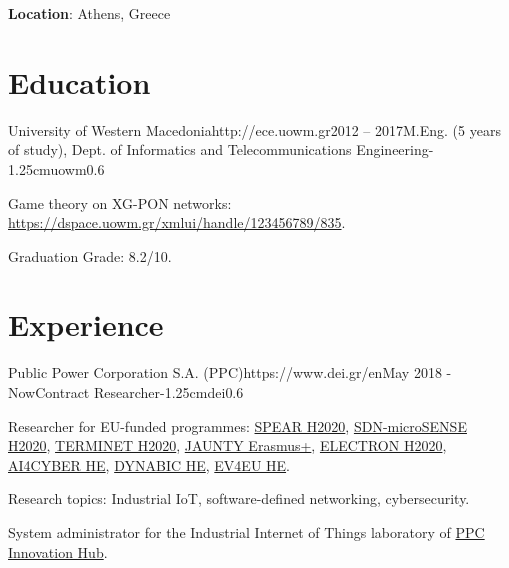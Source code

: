 \documentclass{mycv}
\begin{document}
	\thispagestyle{plain}

	\textbf{Location}: Athens, Greece

	\section{Education}
	
	\begin{EntryDatedLogo}{University of Western Macedonia}{http://ece.uowm.gr}{2012 -- 2017}{M.Eng. (5 years of study), Dept. of Informatics and Telecommunications Engineering}{-1.25cm}{uowm}{0.6}
		\begin{Itemize}
			\item Game theory on XG-PON networks: \url{https://dspace.uowm.gr/xmlui/handle/123456789/835}.
			\item Graduation Grade: 8.2/10.
		\end{Itemize}
	\end{EntryDatedLogo}
	
	\section{Experience}
		\begin{EntryDatedLogo}{Public Power Corporation S.A. (PPC)}{https://www.dei.gr/en}{May 2018 - Now}{Contract Researcher}{-1.25cm}{dei}{0.6}
		\begin{Itemize}
			\item Researcher for EU-funded programmes: \href{https://cordis.europa.eu/project/id/787011}{SPEAR H2020}, \href{https://cordis.europa.eu/project/id/833955}{SDN-microSENSE H2020}, \href{https://cordis.europa.eu/project/id/957406}{TERMINET H2020}, \href{https://www.jaunty.eu/}{JAUNTY Erasmus+}, \href{https://cordis.europa.eu/project/id/101021936}{ELECTRON H2020}, \href{https://cordis.europa.eu/project/id/101070450}{AI4CYBER HE}, \href{https://cordis.europa.eu/project/id/101070455}{DYNABIC HE}, \href{https://cordis.europa.eu/project/id/101056765}{EV4EU HE}.
			\item Research topics: Industrial IoT, software-defined networking, cybersecurity.
			\item System administrator for the Industrial Internet of Things laboratory of \href{https://innovationhub.dei.gr/el/}{PPC Innovation Hub}.
		\end{Itemize}
	\end{EntryDatedLogo}
	
\end{document}
